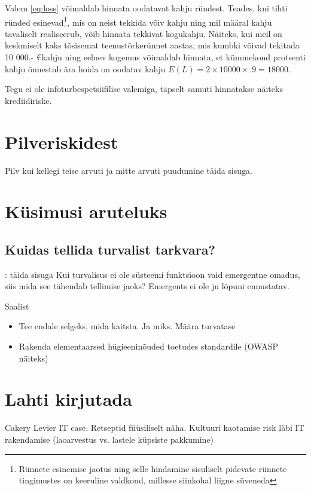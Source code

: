 Valem \ref{eq:loss} võimaldab hinnata oodatavat kahju ründest. Teades, kui tihti ründed esinevad\footnote{Rünnete esinemise jaotus ning selle hindamine sisuliselt pidevate rünnete tingimustes on keeruline valdkond, millesse siinkohal liigne süveneda}, mis on neist tekkida võiv kahju ning mil määral kahju tavaliselt realiseerub, võib hinnata tekkivat kogukahju. Näiteks, kui meil on keskmiselt kaks tõsisemat teenustõrkerünnet aastas, mis kumbki võivad tekitada 10 000.- \euro kahju ning eelnev kogemus võimaldab hinnata, et kümmekond protsenti kahju õnnestub ära hoida on oodatav kahju $E(L)=2 \times 10000 \times .9 = 18 000$. 

Tegu ei ole infoturbespetsiifilise valemiga, täpselt samuti hinnatakse näiteks krediidiriske.

\section{Pilveriskidest}
Pilv kui kellegi teise arvuti ja mitte arvuti puudumine
\TODO täida sisuga. 

\section{Küsimusi aruteluks}
\subsection{Kuidas tellida turvalist tarkvara?}
\TODO: täida sisuga
Kui turvalisus ei ole süsteemi funktsioon vaid emergentne omadus, siis mida see tähendab tellimise jaoks? Emergents ei ole ju lõpuni ennustatav.

Saalist
\begin{itemize}
	\item Tee endale selgeks, mida kaitsta. Ja miks. Määra turvatase
	\item Rakenda elementaarsed hügieeninõuded toetudes standardile (OWASP näiteks)
\end{itemize}


\section{Lahti kirjutada}
Cakery Levier IT case. Retseptid füüsiliselt näha. Kultuuri kaotamise risk läbi IT rakendamise (laoarvestus vs. lastele küpsiste pakkumine)

